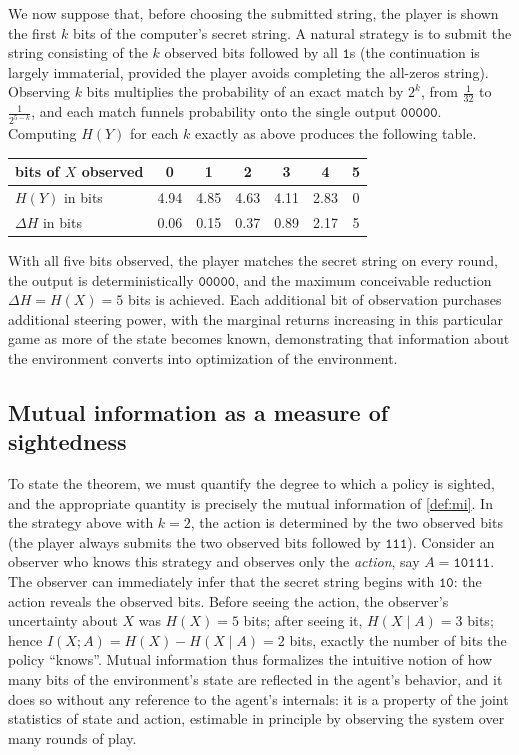 \documentclass[11pt]{article}
\begin{document}
We now suppose that, before choosing the submitted string, the player is shown the first $k$ bits of the computer's secret string. A natural strategy is to submit the string consisting of the $k$ observed bits followed by all $\texttt{1}$s (the continuation is largely immaterial, provided the player avoids completing the all-zeros string). Observing $k$ bits multiplies the probability of an exact match by $2^k$, from $\frac1{32}$ to $\frac{1}{2^{5-k}}$, and each match funnels probability onto the single output $\texttt{00000}$. Computing $H(Y)$ for each $k$ exactly as above produces the following table.

\begin{center}
\begin{tabular}{lcccccc}
\toprule
bits of $X$ observed & 0 & 1 & 2 & 3 & 4 & 5 \\
\midrule
$H(Y)$ in bits & 4.94 & 4.85 & 4.63 & 4.11 & 2.83 & 0 \\
$\Delta H$ in bits & 0.06 & 0.15 & 0.37 & 0.89 & 2.17 & 5 \\
\bottomrule
\end{tabular}
\end{center}

With all five bits observed, the player matches the secret string on every round, the output is deterministically $\texttt{00000}$, and the maximum conceivable reduction $\Delta H = H(X) = 5$ bits is achieved. Each additional bit of observation purchases additional steering power, with the marginal returns increasing in this particular game as more of the state becomes known, demonstrating that information about the environment converts into optimization of the environment.

\subsection{Mutual information as a measure of sightedness}
\label{sec:misighted}

To state the theorem, we must quantify the degree to which a policy is sighted, and the appropriate quantity is precisely the mutual information of \cref{def:mi}. In the strategy above with $k = 2$, the action is determined by the two observed bits (the player always submits the two observed bits followed by $\texttt{111}$). Consider an observer who knows this strategy and observes only the \emph{action}, say $A = \texttt{10111}$. The observer can immediately infer that the secret string begins with $\texttt{10}$: the action reveals the observed bits. Before seeing the action, the observer's uncertainty about $X$ was $H(X) = 5$ bits; after seeing it, $H(X \mid A) = 3$ bits; hence $I(X; A) = H(X) - H(X \mid A) = 2$ bits, exactly the number of bits the policy ``knows''. Mutual information thus formalizes the intuitive notion of how many bits of the environment's state are reflected in the agent's behavior, and it does so without any reference to the agent's internals: it is a property of the joint statistics of state and action, estimable in principle by observing the system over many rounds of play.
\end{document}
